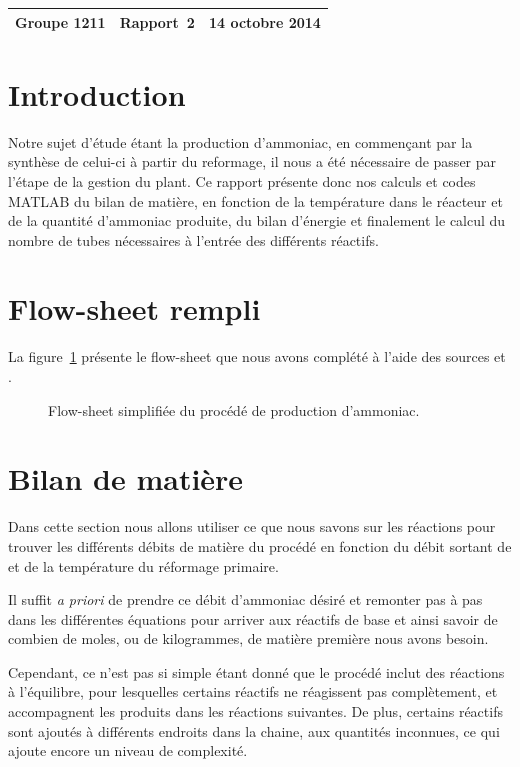 \documentclass[a4paper,12pt]{article}
\begin{document}
\begin{center}
\begin{tabu} to \textwidth {lX[c]r}
    Groupe 1211 & \large{\textbf{Rapport~2}} & 14 octobre 2014 \\
    \hline
\end{tabu}
\end{center}

\section{Introduction}

Notre sujet d'étude étant la production d’ammoniac, en commençant par la synthèse de celui-ci à partir du reformage, il nous a été nécessaire de passer par l’étape de la gestion du plant. Ce rapport présente donc nos calculs et codes MATLAB du bilan de matière, en fonction de la température dans le réacteur et de la quantité d’ammoniac produite, du bilan d’énergie et finalement le calcul du nombre de tubes nécessaires à l’entrée des différents réactifs. 

\section{Flow-sheet rempli}

La figure~\ref{fig:flowsheet2} présente le flow-sheet que nous avons complété à l'aide des sources \cite{epa} et \cite{process-patent}.

\begin{figure}
    \centering
    
    \caption{Flow-sheet simplifiée du procédé de production d'ammoniac.}
    \label{fig:flowsheet2}
\end{figure}

\section{Bilan de matière}

Dans cette section nous allons utiliser ce que nous savons
sur les réactions pour trouver les différents débits de matière du procédé
en fonction du débit sortant de 
et de la température du réformage primaire.

Il suffit \emph{a priori} de prendre ce débit
d’ammoniac désiré et remonter pas à pas
dans les différentes équations pour arriver aux réactifs de base
et ainsi savoir de combien de moles, ou de kilogrammes, de matière première
nous avons besoin.

Cependant, ce n’est pas si simple étant donné
que le procédé inclut des réactions à l’équilibre,
pour lesquelles certains réactifs ne réagissent pas complètement,
et accompagnent les produits dans les réactions suivantes.
De plus, certains réactifs sont ajoutés à différents endroits dans la chaine,
aux quantités inconnues, ce qui ajoute encore un niveau de complexité.
\end{document}
